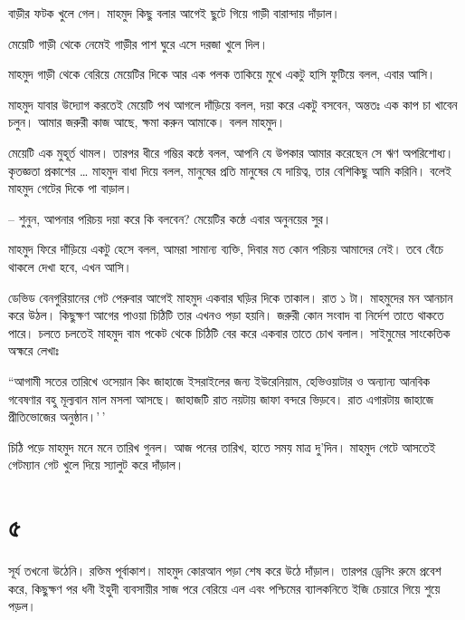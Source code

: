 \documentclass[
]{book}
\begin{document}
বাড়ীর ফটক খুলে গেল। মাহমুদ কিছু বলার আগেই ছুটে গিয়ে গাড়ী বারান্দায় দাঁড়াল।

মেয়েটি গাড়ী থেকে নেমেই গাড়ীর পাশ ঘুরে এসে দরজা খুলে দিল।

মাহমুদ গাড়ী থেকে বেরিয়ে মেয়েটির দিকে আর এক পলক তাকিয়ে মুখে একটু হাসি ফুটিয়ে বলল, এবার আসি।

মাহমুদ যাবার উদ্যোগ করতেই মেয়েটি পথ আগলে দাঁড়িয়ে বলল, দয়া করে একটু বসবেন, অন্ততঃ এক কাপ চা খাবেন চলুন। আমার জরুরী কাজ আছে, ক্ষমা করুন আমাকে। বলল মাহমুদ।

মেয়েটি এক মুহূর্ত থামল। তারপর ধীরে গম্ভির কন্ঠে বলল, আপনি যে উপকার আমার করেছেন সে ঋণ অপরিশোধ্য। কৃতজ্ঞতা প্রকাশের \ldots{} মাহমুদ বাধা দিয়ে বলল, মানুষের প্রতি মানুষের যে দায়িত্ব, তার বেশিকিছু আমি করিনি। বলেই মাহমুদ গেটের দিকে পা বাড়াল।

-- শুনুন, আপনার পরিচয় দয়া করে কি বলবেন? মেয়েটির কন্ঠে এবার অনুনয়ের সুর।

মাহমুদ ফিরে দাঁড়িয়ে একটু হেসে বলল, আমরা সামান্য ব্যক্তি, দিবার মত কোন পরিচয় আমাদের নেই। তবে বেঁচে থাকলে দেখা হবে, এখন আসি।

ডেভিড বেনগুরিয়ানের গেট পেরুবার আগেই মাহমুদ একবার ঘড়ির দিকে তাকাল। রাত ১ টা। মাহমুদের মন আনচান করে উঠল। কিছুক্ষণ আগের পাওয়া চিঠিটি তার এখনও পড়া হয়নি। জরুরী কোন সংবাদ বা নির্দেশ তাতে থাকতে পারে। চলতে চলতেই মাহমুদ বাম পকেট থেকে চিঠিটি বের করে একবার তাতে চোখ বলাল। সাইমুমের সাংকেতিক অহ্মরে লেখাঃ

``আগামী সতের তারিখে ওসেয়ান কিং জাহাজে ইসরাইলের জন্য ইউরেনিয়াম, হেভিওয়াটার ও অন্যান্য আনবিক গবেষণার বহু মূল্যবান মাল মসলা আসছে। জাহাজটি রাত নয়টায় জাফা বন্দরে ভিড়বে। রাত এগারটায় জাহাজে প্রীতিভোজের অনুষ্ঠান।'\,'

চিঠি পড়ে মাহমুদ মনে মনে তারিখ গুনল। আজ পনের তারিখ, হাতে সময় মাত্র দু'দিন। মাহমুদ গেটে আসতেই গেটম্যান গেট খুলে দিয়ে স্যালুট করে দাঁড়াল।

\section*{৫}\label{ota-1-5}

সূর্য তখনো উঠেনি। রক্তিম পূর্বাকাশ। মাহমুদ কোরআন পড়া শেষ করে উঠে দাঁড়াল। তারপর ড্রেসিং রুমে প্রবেশ করে, কিছুক্ষণ পর ধনী ইহুদী ব্যবসায়ীর সাজ পরে বেরিয়ে এল এবং পশ্চিমের ব্যালকনিতে ইজি চেয়ারে গিয়ে শুয়ে পড়ল।
\end{document}
